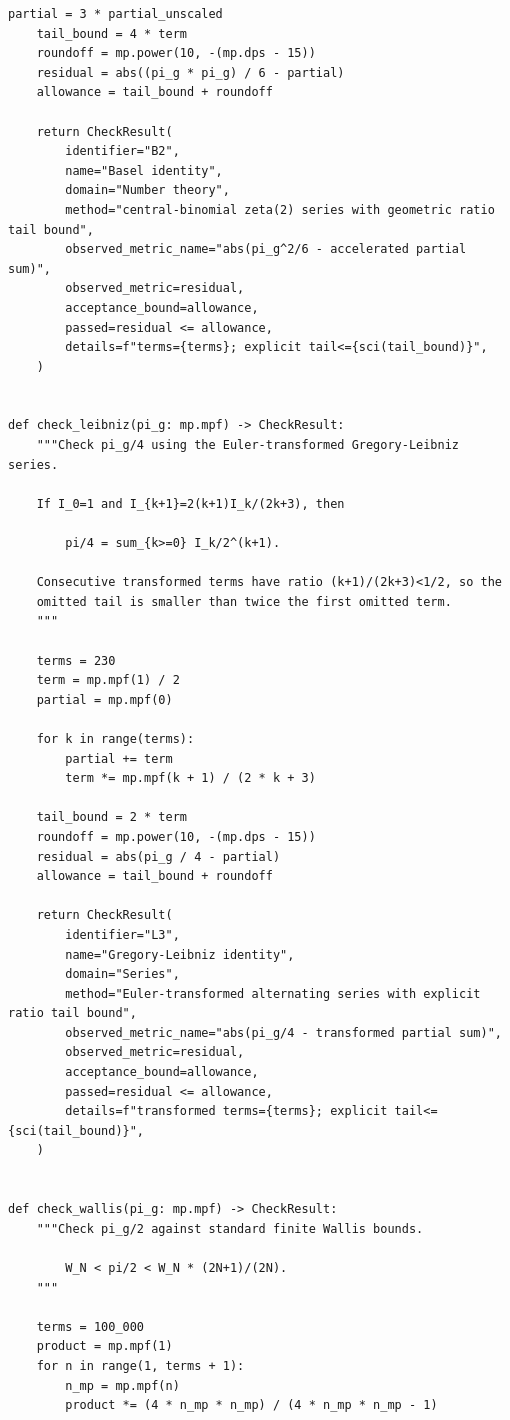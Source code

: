 \documentclass[11pt]{article}
\begin{document}
\begin{lstlisting}[style=pythonstyle,caption={Verification driver: \texttt{verify\_pi\_g\_identities.py}}]
    partial = 3 * partial_unscaled
    tail_bound = 4 * term
    roundoff = mp.power(10, -(mp.dps - 15))
    residual = abs((pi_g * pi_g) / 6 - partial)
    allowance = tail_bound + roundoff

    return CheckResult(
        identifier="B2",
        name="Basel identity",
        domain="Number theory",
        method="central-binomial zeta(2) series with geometric ratio tail bound",
        observed_metric_name="abs(pi_g^2/6 - accelerated partial sum)",
        observed_metric=residual,
        acceptance_bound=allowance,
        passed=residual <= allowance,
        details=f"terms={terms}; explicit tail<={sci(tail_bound)}",
    )


def check_leibniz(pi_g: mp.mpf) -> CheckResult:
    """Check pi_g/4 using the Euler-transformed Gregory-Leibniz series.

    If I_0=1 and I_{k+1}=2(k+1)I_k/(2k+3), then

        pi/4 = sum_{k>=0} I_k/2^(k+1).

    Consecutive transformed terms have ratio (k+1)/(2k+3)<1/2, so the
    omitted tail is smaller than twice the first omitted term.
    """

    terms = 230
    term = mp.mpf(1) / 2
    partial = mp.mpf(0)

    for k in range(terms):
        partial += term
        term *= mp.mpf(k + 1) / (2 * k + 3)

    tail_bound = 2 * term
    roundoff = mp.power(10, -(mp.dps - 15))
    residual = abs(pi_g / 4 - partial)
    allowance = tail_bound + roundoff

    return CheckResult(
        identifier="L3",
        name="Gregory-Leibniz identity",
        domain="Series",
        method="Euler-transformed alternating series with explicit ratio tail bound",
        observed_metric_name="abs(pi_g/4 - transformed partial sum)",
        observed_metric=residual,
        acceptance_bound=allowance,
        passed=residual <= allowance,
        details=f"transformed terms={terms}; explicit tail<={sci(tail_bound)}",
    )


def check_wallis(pi_g: mp.mpf) -> CheckResult:
    """Check pi_g/2 against standard finite Wallis bounds.

        W_N < pi/2 < W_N * (2N+1)/(2N).
    """

    terms = 100_000
    product = mp.mpf(1)
    for n in range(1, terms + 1):
        n_mp = mp.mpf(n)
        product *= (4 * n_mp * n_mp) / (4 * n_mp * n_mp - 1)


\end{lstlisting}
\end{document}
